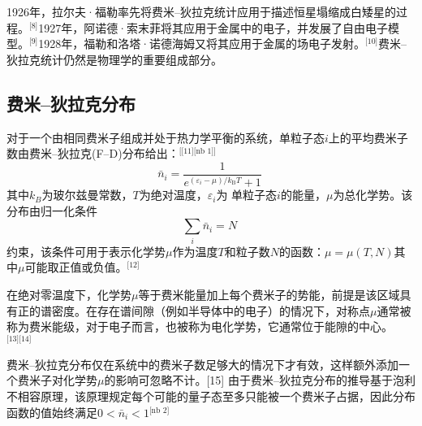 1926年，拉尔夫·福勒率先将费米–狄拉克统计应用于描述恒星塌缩成白矮星的过程。\(^\text{[8]}\)1927年，阿诺德·索末菲将其应用于金属中的电子，并发展了自由电子模型。\(^\text{[9]}\)1928年，福勒和洛塔·诺德海姆又将其应用于金属的场电子发射。\(^\text{[10]}\)费米–狄拉克统计仍然是物理学的重要组成部分。
\subsection{费米–狄拉克分布}  
对于一个由相同费米子组成并处于热力学平衡的系统，单粒子态\( i \)上的平均费米子数由费米–狄拉克(F–D)分布给出：\(^\text{[[11][nb 1]]}\)   
\[
\bar{n}_{i} = \frac{1}{e^{(\varepsilon_{i} - \mu)/k_{\text{B}}T} + 1}~
\]
其中\(k_B\)为玻尔兹曼常数，\(T\)为绝对温度，\(\varepsilon_i\)为 单粒子态\(i\)的能量，\(\mu\)为总化学势。该分布由归一化条件
\[\sum_{i} \bar{n}_{i} = N~\]
约束，该条件可用于表示化学势\(\mu\)作为温度\(T\)和粒子数\(N\)的函数：\(\mu = \mu (T, N)\)其中\(\mu\)可能取正值或负值。\(^\text{[12]}\)

在绝对零温度下，化学势\(\mu\)等于费米能量加上每个费米子的势能，前提是该区域具有正的谱密度。在存在谱间隙（例如半导体中的电子）的情况下，对称点\(\mu\)通常被称为费米能级，对于电子而言，也被称为电化学势，它通常位于能隙的中心。\(^\text{[13][14]}\)

费米–狄拉克分布仅在系统中的费米子数足够大的情况下才有效，这样额外添加一个费米子对化学势\(\mu\)的影响可忽略不计。[15] 由于费米–狄拉克分布的推导基于泡利不相容原理，该原理规定每个可能的量子态至多只能被一个费米子占据，因此分布函数的值始终满足\(0 < \bar{n}_i < 1\)\(^\text{[nb 2]}\)
